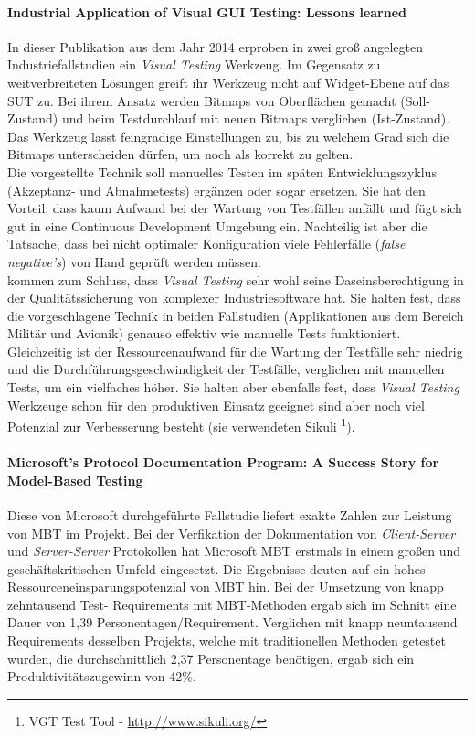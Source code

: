 \paragraph{Industrial Application of Visual GUI Testing: Lessons learned \cite{alegroth_industrial_2014}}In dieser Publikation aus dem Jahr 2014 erproben \citeauthor{alegroth_industrial_2014} in zwei groß angelegten Industriefallstudien ein \textit{Visual Testing} Werkzeug. Im Gegensatz zu weitverbreiteten Lösungen greift ihr Werkzeug nicht auf Widget-Ebene auf das \Gls{SUT} zu. Bei ihrem Ansatz werden Bitmaps von Oberflächen gemacht (Soll-Zustand) und beim Testdurchlauf mit neuen Bitmaps verglichen (Ist-Zustand). Das Werkzeug lässt feingradige Einstellungen zu, bis zu welchem Grad sich die Bitmaps unterscheiden dürfen, um noch als korrekt zu gelten.\\
Die vorgestellte Technik soll manuelles Testen im späten Entwicklungszyklus (Akzeptanz- und Abnahmetests) ergänzen oder sogar ersetzen. Sie hat den Vorteil, dass kaum Aufwand bei der Wartung von Testfällen anfällt und fügt sich gut in eine Continuous Development Umgebung ein. Nachteilig ist aber die Tatsache, dass bei nicht optimaler Konfiguration viele Fehlerfälle (\textit{false negative's}) von Hand geprüft werden müssen.\\
\citeauthor{alegroth_industrial_2014} kommen zum Schluss, dass \textit{Visual Testing} sehr wohl seine Daseinsberechtigung in der Qualitätssicherung von komplexer Industriesoftware hat. Sie halten fest, dass die vorgeschlagene Technik in beiden Fallstudien (Applikationen aus dem Bereich Militär und Avionik) genauso effektiv wie manuelle Tests funktioniert. Gleichzeitig ist der Ressourcenaufwand für die Wartung der Testfälle sehr niedrig und die Durchführungsgeschwindigkeit der Testfälle, verglichen mit manuellen Tests, um ein vielfaches höher. Sie halten aber ebenfalls fest, dass \textit{Visual Testing} Werkzeuge schon für den produktiven Einsatz geeignet sind aber noch viel Potenzial zur Verbesserung besteht (sie verwendeten Sikuli \footnote{VGT Test Tool - \url{http://www.sikuli.org/}}).

\paragraph{Microsoft’s Protocol Documentation Program: A Success Story for Model-Based Testing \cite{grieskamp_microsofts_2010}}\label{sec:microsoft_fallstudie}
Diese von Microsoft durchgeführte Fallstudie liefert exakte Zahlen zur Leistung von \Gls{MBT} im Projekt. Bei der Verfikation der Dokumentation von \textit{Client-Server} und \textit{Server-Server} Protokollen hat Microsoft \Gls{MBT} erstmals in einem großen und geschäftskritischen Umfeld eingesetzt. Die Ergebnisse deuten auf ein hohes Ressourceneinsparungspotenzial von \Gls{MBT} hin. Bei der Umsetzung von knapp zehntausend Test- Requirements mit MBT-Methoden ergab sich im Schnitt eine Dauer von 1,39 Personentagen/Requirement. Verglichen mit knapp neuntausend Requirements desselben Projekts, welche mit traditionellen Methoden getestet wurden, die durchschnittlich 2,37 Personentage benötigen, ergab sich ein Produktivitätszugewinn von 42\%.

